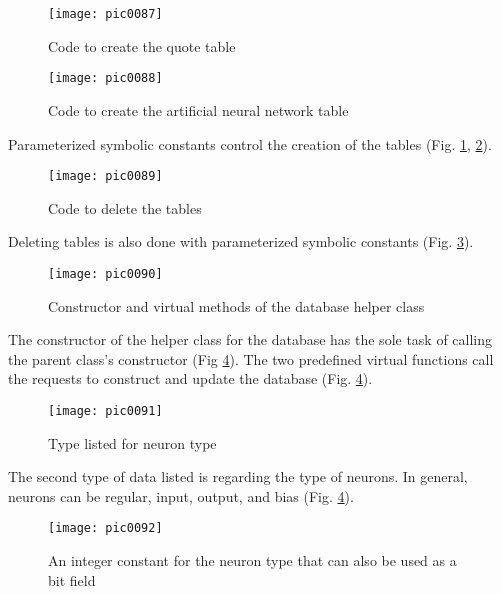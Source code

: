 \begin{figure}[h]
\centering
\texttt{[image: pic0087]}
\caption{Code to create the quote table}
\label{fig:pic0087}
\end{figure}
\FloatBarrier

\begin{figure}[h]
\centering
\texttt{[image: pic0088]}
\caption{Code to create the artificial neural network table}
\label{fig:pic0088}
\end{figure}
\FloatBarrier

Parameterized symbolic constants control the creation of the tables (Fig. \ref{fig:pic0087}, \ref{fig:pic0088}).

\begin{figure}[h]
\centering
\texttt{[image: pic0089]}
\caption{Code to delete the tables}
\label{fig:pic0089}
\end{figure}
\FloatBarrier

Deleting tables is also done with parameterized symbolic constants (Fig. \ref{fig:pic0089}).

\begin{figure}[h]
\centering
\texttt{[image: pic0090]}
\caption{Constructor and virtual methods of the database helper class}
\label{fig:pic0090}
\end{figure}
\FloatBarrier

The constructor of the helper class for the database has the sole task of calling the parent class's constructor (Fig \ref{fig:pic0090}). The two predefined virtual functions call the requests to construct and update the database (Fig. \ref{fig:pic0090}).

\begin{figure}[h]
\centering
\texttt{[image: pic0091]}
\caption{Type listed for neuron type}
\label{fig:pic0091}
\end{figure}
\FloatBarrier

The second type of data listed is regarding the type of neurons. In general, neurons can be regular, input, output, and bias (Fig. \ref{fig:pic0090}).

\begin{figure}[h]
\centering
\texttt{[image: pic0092]}
\caption{An integer constant for the neuron type that can also be used as a bit field}
\label{fig:pic0092}
\end{figure}
\FloatBarrier

